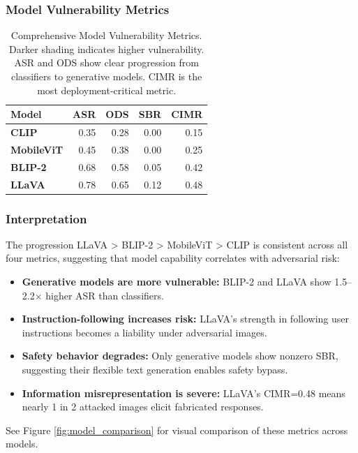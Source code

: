 \documentclass[11pt]{article}
\begin{document}
\subsubsection{Model Vulnerability Metrics}

\begin{table}[H]
\centering
\begin{tabular}{|l|r|r|r|r|}
\hline
\textbf{Model} & \textbf{ASR} & \textbf{ODS} & \textbf{SBR} & \textbf{CIMR} \\
\hline
\textbf{CLIP} & 0.35 & 0.28 & 0.00 & 0.15 \\
\hline
\textbf{MobileViT} & 0.45 & 0.38 & 0.00 & 0.25 \\
\hline
\textbf{BLIP-2} & 0.68 & 0.58 & 0.05 & 0.42 \\
\hline
\textbf{LLaVA} & 0.78 & 0.65 & 0.12 & 0.48 \\
\hline
\end{tabular}
\caption{Comprehensive Model Vulnerability Metrics. Darker shading indicates higher vulnerability. ASR and ODS show clear progression from classifiers to generative models. CIMR is the most deployment-critical metric.}
\label{tab:metrics}
\end{table}

\subsubsection{Interpretation}

The progression LLaVA > BLIP-2 > MobileViT > CLIP is consistent across all four metrics, suggesting that model capability correlates with adversarial risk:

\begin{itemize}[leftmargin=2em]
    \item \textbf{Generative models are more vulnerable:} BLIP-2 and LLaVA show 1.5--2.2× higher ASR than classifiers.
    \item \textbf{Instruction-following increases risk:} LLaVA's strength in following user instructions becomes a liability under adversarial images.
    \item \textbf{Safety behavior degrades:} Only generative models show nonzero SBR, suggesting their flexible text generation enables safety bypass.
    \item \textbf{Information misrepresentation is severe:} LLaVA's CIMR=0.48 means nearly 1 in 2 attacked images elicit fabricated responses.
\end{itemize}

See Figure \ref{fig:model_comparison} for visual comparison of these metrics across models.
\end{document}
